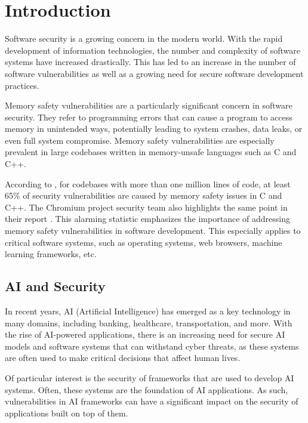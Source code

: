\section{Introduction}

Software security is a growing concern in the modern world. With the rapid development of information technologies, the number and complexity of software systems have increased drastically. This has led to an increase in the number of software vulnerabilities as well as a growing need for secure software development practices.

Memory safety vulnerabilities are a particularly significant concern in software security. They refer to programming errors that can cause a program to access memory in unintended ways, potentially leading to system crashes, data leaks, or even full system compromise. Memory safety vulnerabilities are especially prevalent in large codebases written in memory-unsafe languages such as C and C++.

According to \cite{what-science-can-tell-us-about-c-and-c++-security}, for codebases with more than one million lines of code, at least 65\% of security vulnerabilities are caused by memory safety issues in C and C++. The Chromium project security team also highlights the same point in their report \cite{chromium-project-memory-safety}. This alarming statistic emphasizes the importance of addressing memory safety vulnerabilities in software development. This especially applies to critical software systems, such as operating systems, web browsers, machine learning frameworks, etc.

\subsection{AI and Security}


In recent years, AI (Artificial Intelligence) has emerged as a key technology in many domains, including banking, healthcare, transportation, and more. With the rise of AI-powered applications, there is an increasing need for secure AI models and software systems that can withstand cyber threats, as these systems are often used to make critical decisions that affect human lives.

Of particular interest is the security of frameworks that are used to develop AI systems. Often, these systems are the foundation of AI applications. As such, vulnerabilities in AI frameworks can have a significant impact on the security of applications built on top of them.


